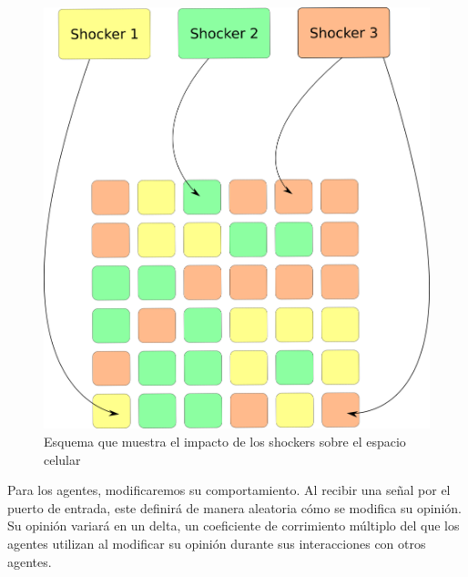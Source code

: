 \begin{figure}[!h]
\centering
\includegraphics[scale=0.5]{imagenes/agentes_celdas_modelo.png}
\caption{Esquema que muestra el impacto de los shockers sobre el espacio celular}
\label{fig:modelo_shockers}
\end{figure}

Para los agentes, modificaremos su comportamiento. Al recibir una señal por el puerto de entrada, este definirá de manera aleatoria cómo se modifica su opinión. Su opinión variará en un delta, un coeficiente de corrimiento múltiplo del que los agentes utilizan al modificar su opinión durante sus interacciones con otros agentes.



